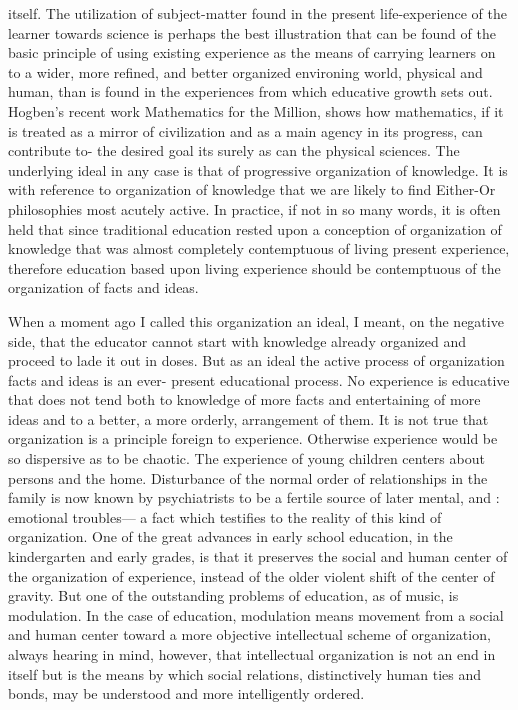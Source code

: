 itself. The utilization of subject-matter found in the present life-experience of the learner 
towards science is perhaps the best illustration that can be found of the basic principle of 
using existing experience as the means of carrying learners on to a wider, more refined, 
and better organized environing world, physical and human, than is found in the 
experiences from which educative growth sets out. Hogben's recent work Mathematics 
for the Million, shows how mathematics, if it is treated as a mirror of civilization and as 
a main agency in its progress, can contribute to- the desired goal its surely as can the 
physical sciences. The underlying ideal in any case is that of progressive organization of 
knowledge. It is with reference to organization of knowledge that we are likely to find 
Either-Or philosophies most acutely active. In practice, if not in so many words, it is 
often held that since traditional education rested upon a conception of organization of 
knowledge that was almost completely contemptuous of living present experience, 
therefore education based upon living experience should be contemptuous of the 
organization of facts and ideas. 

When a moment ago I called this organization an ideal, I meant, on the negative side, 
that the educator cannot start with knowledge already organized and proceed to lade it out 
in doses. But as an ideal the active process of organization facts and ideas is an ever- 
present educational process. No experience is educative that does not tend both to 
knowledge of more facts and entertaining of more ideas and to a better, a more orderly, 
arrangement of them. It is not true that organization is a principle foreign to experience. 
Otherwise experience would be so dispersive as to be chaotic. The experience of young 
children centers about persons and the home. Disturbance of the normal order of 
relationships in the family is now known by psychiatrists to be a fertile source of later 
mental, and : emotional troubles— a fact which testifies to the reality of this kind of 
organization. One of the great advances in early school education, in the kindergarten and 
early grades, is that it preserves the social and human center of the organization of 
experience, instead of the older violent shift of the center of gravity. But one of the 
outstanding problems of education, as of music, is modulation. In the case of education, 
modulation means movement from a social and human center toward a more objective 
intellectual scheme of organization, always hearing in mind, however, that intellectual 
organization is not an end in itself but is the means by which social relations, distinctively 
human ties and bonds, may be understood and more intelligently ordered. 

